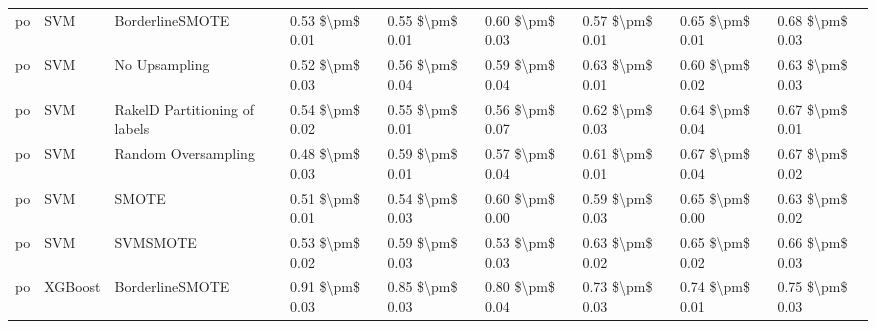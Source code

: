 \begin{tabular}{lllllllll}
      po &                             SVM &               BorderlineSMOTE &     0.53 \$\textbackslash pm\$ 0.01 &           0.55 \$\textbackslash pm\$ 0.01 &       0.60 \$\textbackslash pm\$ 0.03 &        0.57 \$\textbackslash pm\$ 0.01 &                         0.65 \$\textbackslash pm\$ 0.01 &     0.68 \$\textbackslash pm\$ 0.03 \\
      po &                             SVM &                 No Upsampling &     0.52 \$\textbackslash pm\$ 0.03 &           0.56 \$\textbackslash pm\$ 0.04 &       0.59 \$\textbackslash pm\$ 0.04 &        0.63 \$\textbackslash pm\$ 0.01 &                         0.60 \$\textbackslash pm\$ 0.02 &     0.63 \$\textbackslash pm\$ 0.03 \\
      po &                             SVM & RakelD Partitioning of labels &     0.54 \$\textbackslash pm\$ 0.02 &           0.55 \$\textbackslash pm\$ 0.01 &       0.56 \$\textbackslash pm\$ 0.07 &        0.62 \$\textbackslash pm\$ 0.03 &                         0.64 \$\textbackslash pm\$ 0.04 &     0.67 \$\textbackslash pm\$ 0.01 \\
      po &                             SVM &           Random Oversampling &     0.48 \$\textbackslash pm\$ 0.03 &           0.59 \$\textbackslash pm\$ 0.01 &       0.57 \$\textbackslash pm\$ 0.04 &        0.61 \$\textbackslash pm\$ 0.01 &                         0.67 \$\textbackslash pm\$ 0.04 &     0.67 \$\textbackslash pm\$ 0.02 \\
      po &                             SVM &                         SMOTE &     0.51 \$\textbackslash pm\$ 0.01 &           0.54 \$\textbackslash pm\$ 0.03 &       0.60 \$\textbackslash pm\$ 0.00 &        0.59 \$\textbackslash pm\$ 0.03 &                         0.65 \$\textbackslash pm\$ 0.00 &     0.63 \$\textbackslash pm\$ 0.02 \\
      po &                             SVM &                      SVMSMOTE &     0.53 \$\textbackslash pm\$ 0.02 &           0.59 \$\textbackslash pm\$ 0.03 &       0.53 \$\textbackslash pm\$ 0.03 &        0.63 \$\textbackslash pm\$ 0.02 &                         0.65 \$\textbackslash pm\$ 0.02 &     0.66 \$\textbackslash pm\$ 0.03 \\
      po &                         XGBoost &               BorderlineSMOTE &     0.91 \$\textbackslash pm\$ 0.03 &           0.85 \$\textbackslash pm\$ 0.03 &       0.80 \$\textbackslash pm\$ 0.04 &        0.73 \$\textbackslash pm\$ 0.03 &                         0.74 \$\textbackslash pm\$ 0.01 &     0.75 \$\textbackslash pm\$ 0.03 \\

\end{tabular}
